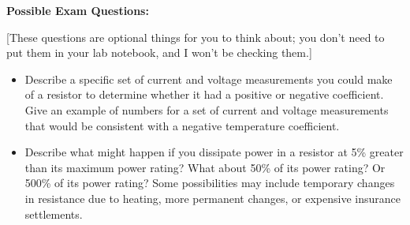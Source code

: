 \textbf{Possible Exam Questions:}

[These questions are optional things for you to think about; you don't need to put them in your lab notebook, and I won't be checking them.]

\begin{itemize}
\item Describe a specific set of current and voltage measurements you could make of a resistor to determine whether it had a positive or negative coefficient.  Give an example of numbers for a set of current and voltage measurements that would be consistent with a negative temperature coefficient.

\item Describe what might happen if you dissipate power in a resistor at 5\% greater than its maximum power rating?  What about 50\% of its power rating?  Or 500\% of its power rating?  Some possibilities may include temporary changes in resistance due to heating, more permanent changes, or expensive insurance settlements.
\end{itemize}





